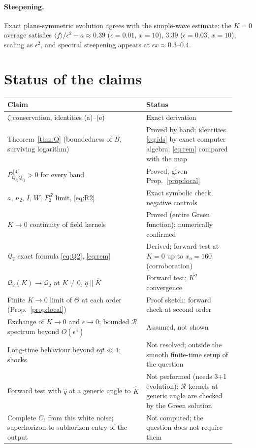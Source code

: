 \documentclass[10pt]{article}
\newcommand{\eps}{\epsilon}
\newcommand{\Q}{\mathcal Q_2}
\newcommand{\R}{\mathcal R}
\newcommand{\Kh}{\hat K}
\newcommand{\qh}{\hat q}
\begin{document}
\paragraph{Steepening.} Exact plane-symmetric evolution agrees with the simple-wave estimate: the $K=0$ average satisfies $\langle f\rangle/\eps^2-a\approx0.39$ ($\eps=0.01$, $x=10$), $3.39$ ($\eps=0.03$, $x=10$), scaling as $\eps^2$, and spectral steepening appears at $\eps x\approx0.3$--$0.4$.

\section{Status of the claims}

\begin{center}
\begin{tabular}{p{0.56\linewidth}p{0.36\linewidth}}
\toprule
Claim & Status\\
\midrule
$\zeta$ conservation, identities (a)--(e) & Exact derivation\\
Theorem~\ref{thm:Q} (boundedness of $B$, surviving logarithm) & Proved by hand; identities \eqref{eq:ids} by exact computer algebra; \eqref{eq:rem} compared with the map\\
$P^{[4]}_{Q_{ij}Q_{ij}}>0$ for every band & Proved, given Prop.~\ref{prop:local}\\
$a$, $n_2$, $I$, $W$, $F_2^\R$ limit, \eqref{eq:R2} & Exact symbolic check, negative controls\\
$K\to0$ continuity of field kernels & Proved (entire Green function); numerically confirmed\\
$\Q$ exact formula \eqref{eq:Q2}, \eqref{eq:rem} & Derived; forward test at $K=0$ up to $x_o=160$ (corroboration)\\
$\Q(K)\to\Q$ at $K\ne0$, $\qh\parallel\Kh$ & Forward test; $K^2$ convergence\\
Finite $K\to0$ limit of $\Theta$ at each order (Prop.~\ref{prop:local}) & Proof sketch; forward check at second order\\
Exchange of $K\to0$ and $\eps\to0$; bounded $\R$ spectrum beyond $O(\eps^4)$ & Assumed, not shown\\
Long-time behaviour beyond $\eps qt\ll1$; shocks & Not resolved; outside the smooth finite-time setup of the question\\
Forward test with $\qh$ at a generic angle to $\Kh$ & Not performed (needs 3+1 evolution); $\R$ kernels at generic angle are checked by the Green solution\\
Complete $C_\ell$ from this white noise; superhorizon-to-subhorizon entry of the output & Not computed; the question does not require them\\
\bottomrule
\end{tabular}
\end{center}
\end{document}
